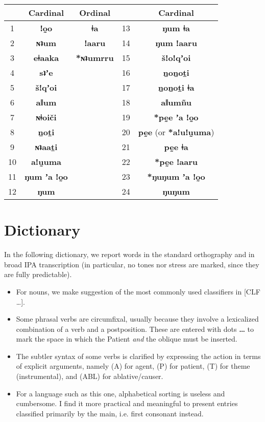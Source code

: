 \documentclass[11pt,a5paper]{book}
\newcommand{\qcn}[1]{\textcolor{AccentText}{\large\textbf{#1}}}
\begin{document}
\begin{center}

\begin{tabular}{ccccc}
\hline
& Cardinal & Ordinal & & Cardinal\\ \hline \hline
1 & \qcn{ǃo̰o} & \qcn{ǂa} & 13 & \qcn{ŋum ǂa} \\ \hline
2 & \qcn{ɴʇum} & \qcn{ǃaaru} & 14  &  \qcn{ŋum ǃaaru} \\ \hline
3 & \qcn{eǂaaka} & \qcn{*ɴʇumrru} & 15 & \qcn{šǃoǃqʼoi} \\ \hline
4 & \qcn{sʇʼe} & & 16 & \qcn{ṉoṉoṯi} \\ \hline
5 & \qcn{šǃqʼoi} & & 17 & \qcn{ṉoṉoṯi ǂa} \\ \hline
6 & \qcn{aǁum} & & 18 & \qcn{aǁumñu}  \\ \hline
7 & \qcn{ɴǂoiči} & & 19 & \qcn{*pḛe ʼa ǃo̰o}\\ \hline
8 & \qcn{ṉoṯi} && 20 & \qcn{pḛe} (or \qcn{*aǃuǃṵuma})\\ \hline
9 & \qcn{ɴʇaaṯi} & & 21 & \qcn{pḛe ǂa} \\ \hline
10 & \qcn{aǃṵuma} & & 22 & \qcn{*pḛe ǃaaru} \\ \hline
11 & \qcn{ŋum ʼa ǃo̰o} & & 23 & \qcn{*ŋuŋum ʼa ǃo̰o} \\ \hline
12 & \qcn{ŋum}  & & 24 & \qcn{ŋuŋum} \\ \hline 
\end{tabular}

\end{center}



\section{Dictionary}

In the following dictionary, we report words in the standard orthography and in broad IPA transcription (in particular, no tones nor stress are marked, since they are fully predictable).

\begin{itemize}
	\item For nouns, we make suggestion of the most commonly used classifiers in [CLF \ldots].
	\item Some phrasal verbs are circumfixal, usually because they involve a lexicalized combination of a verb and a postposition. These are entered with dots \qcn{\ldots} to mark the space in which the Patient \emph{and} the oblique must be inserted.
	\item The subtler syntax of some verbs is clarified by expressing the action in terms of explicit arguments, namely (A) for agent, (P) for patient, (T) for theme (instrumental), and (ABL) for ablative/causer.
	\item For a language such as this one, alphabetical sorting is useless and cumbersome. I find it more practical and meaningful to present entries classified primarily by the main, i.e. first consonant instead.
\end{itemize}
\end{document}
